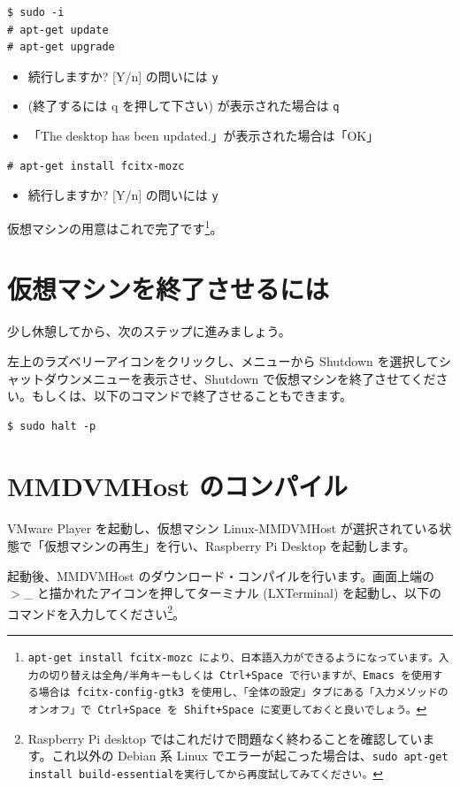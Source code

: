 \documentclass[a4j,oneside]{ujbook}
\begin{document}
\begin{verbatim}
$ sudo -i
# apt-get update
# apt-get upgrade
\end{verbatim}
\begin{itemize}
 \renewcommand{\labelitemi}{$\triangleright$}
 \item 続行しますか? [Y/n] の問いには \verb+y+
 \item (終了するには q を押して下さい) が表示された場合は \verb+q+
 \item 「The desktop has been updated.」が表示された場合は「OK」
\end{itemize}
\begin{verbatim}
# apt-get install fcitx-mozc
\end{verbatim}
\begin{itemize}
 \renewcommand{\labelitemi}{$\triangleright$}
 \item 続行しますか? [Y/n] の問いには \verb+y+
\end{itemize}

仮想マシンの用意はこれで完了です\footnote{\tt{apt-get install fcitx-mozc} により、日本語入力ができるようになっています。入力の切り替えは全角/半角キーもしくは Ctrl+Space で行いますが、Emacs を使用する場合は \tt{fcitx-config-gtk3} を使用し、「全体の設定」タブにある「入力メソッドのオンオフ」で Ctrl+Space を Shift+Space に変更しておくと良いでしょう。}。

\section{仮想マシンを終了させるには}
少し休憩してから、次のステップに進みましょう。

左上のラズベリーアイコンをクリックし、メニューから Shutdown を選択してシャットダウンメニューを表示させ、Shutdown で仮想マシンを終了させてください。もしくは、以下のコマンドで終了させることもできます。

\begin{verbatim}
$ sudo halt -p
\end{verbatim}

\section{MMDVMHost のコンパイル}

VMware Player を起動し、仮想マシン Linux-MMDVMHost が選択されている状態で「仮想マシンの再生」を行い、Raspberry Pi Desktop を起動します。

起動後、MMDVMHost のダウンロード・コンパイルを行います。画面上端の $>$\_ と描かれたアイコンを押してターミナル (LXTerminal) を起動し、以下のコマンドを入力してください\footnote{Raspberry Pi desktop ではこれだけで問題なく終わることを確認しています。これ以外の Debian 系 Linux でエラーが起こった場合は、\tt{sudo apt-get install build-essential}を実行してから再度試してみてください。}。
\end{document}
